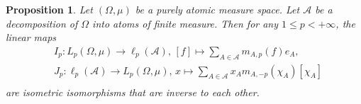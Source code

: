 \documentclass[12pt]{article}
\newtheorem{proposition}[theorem]{Proposition}
\begin{document}
\begin{proposition}\label{LpOnPurAtomMeasSpRepr}
    Let $(\Omega,\mu)$ be a purely atomic measure space. Let $\mathcal{A}$ be a 
    decomposition of $\Omega$ into atoms of finite measure. Then for 
    any $1\leq p<+\infty$, the linear maps
    \[
    \begin{aligned}
        &I_p:
        L_p(\Omega,\mu)\to \ell_p(\mathcal{A}),\,
        [f]\mapsto\sum_{A\in\mathcal{A}} m_{A,p}(f) e_A, \\
        &J_p:
        \ell_p(\mathcal{A})\to L_p(\Omega,\mu),\,
        x\mapsto\sum_{A\in\mathcal{A}} x_A m_{A,-p}(\chi_A) [\chi_A]\\
    \end{aligned}
    \]
    are isometric isomorphisms that are inverse to each other.
\end{proposition}
\end{document}
